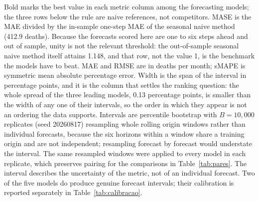 \begin{table}[htbp]
\vspace{0.5em}
\begin{minipage}{\textwidth}
\footnotesize
Bold marks the best value in each metric column among the forecasting models; the three
rows below the rule are naive references, not competitors. MASE is the MAE divided by the
in-sample one-step MAE of the seasonal naive method (412.9 deaths). Because the
forecasts scored here are one to six steps ahead and out of sample, unity is not the
relevant threshold: the out-of-sample seasonal naive method itself attains
1.148, and that row, not the value 1, is the benchmark the
models have to beat. MAE and RMSE are in deaths per month;
sMAPE is symmetric mean absolute percentage error. Width is the span of the interval in
percentage points, and it is the column that settles the ranking question: the whole
spread of the three leading models,
0.13
percentage points, is smaller than the width of any one of their intervals, so the order
in which they appear is not an ordering the data supports. Intervals are percentile bootstrap
with $B=10,000$ replicates (seed 20260817) resampling whole rolling origin windows rather
than individual forecasts, because the six horizons within a window share a training
origin and are not independent; resampling forecast by forecast would understate the
interval. The same resampled windows were applied to every model in each replicate,
which preserves pairing for the comparisons in Table~\ref{tab:pares}. The interval
describes the uncertainty of the metric, not of an individual forecast. Two of the five
models do produce genuine forecast intervals; their calibration is reported separately in
Table~\ref{tab:calibracao}.
\end{minipage}
\end{table}
